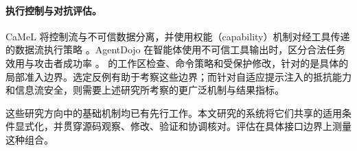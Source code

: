 \paragraph{执行控制与对抗评估。}
CaMeL 将控制流与不可信数据分离，并使用权能（capability）机制对经工具传递的数据流执行策略 \cite{debenedetti2025camel}。AgentDojo 在智能体使用不可信工具输出时，区分合法任务效用与攻击者成功率 \cite{debenedetti2024agentdojo}。\wcode{} 的工作区检查、命令策略和受保护修改，针对的是具体的局部准入边界。选定反例有助于考察这些边界；而针对自适应提示注入的抵抗能力和信息流安全，则需要上述研究所考察的更广泛机制与结果指标。

这些研究方向中的基础机制均已有先行工作。本文研究的系统将它们共享的适用条件显式化，并贯穿源码观察、修改、验证和协调核对。评估在具体接口边界上测量这种组合。
